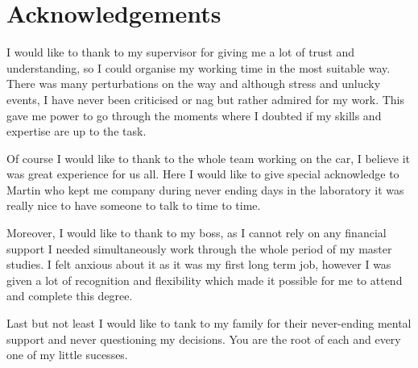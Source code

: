 \chapter{Acknowledgements}

I would like to thank to my supervisor for giving me a lot of trust and understanding, so I could organise my working time in the most suitable way. There was many perturbations on the way and although stress and unlucky events, I have never been criticised or nag but rather admired for my work. This gave me power to go through the moments where I doubted if my skills and expertise are up to the task.

Of course I would like to thank to the whole team working on the car, I believe it was great experience for us all. Here I would like to give special acknowledge to Martin who kept me company during never ending days in the laboratory it was really nice to have someone to talk to time to time.

Moreover, I would like to thank to my boss, as I cannot rely on any financial support I needed simultaneously work through the whole period of my master studies. I felt anxious about it as it was my first long term job, however I was given a lot of recognition and flexibility which made it possible for me to attend and complete this degree.

Last but not least I would like to tank to my family for their never-ending mental support and never questioning my decisions. You are the root of each and every one of my little sucesses.  